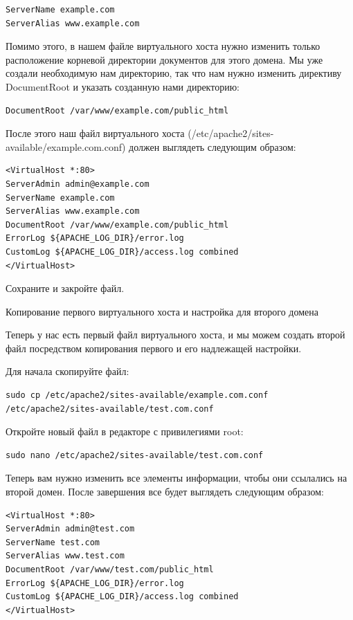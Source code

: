 \documentclass[14pt, a4paper]{article}
\begin{document}
\begin{lstlisting}
ServerName example.com
ServerAlias www.example.com
\end{lstlisting}

Помимо этого, в нашем файле виртуального хоста нужно изменить только расположение корневой 
директории документов для этого домена. Мы уже создали необходимую нам директорию, так что 
нам нужно изменить директиву DocumentRoot и указать созданную нами директорию:

\begin{lstlisting}
DocumentRoot /var/www/example.com/public_html
\end{lstlisting}

После этого наш файл виртуального хоста \linebreak (/etc/apache2/sites-available/example.com.conf) должен выглядеть следующим образом:

\begin{lstlisting}
<VirtualHost *:80>
ServerAdmin admin@example.com
ServerName example.com
ServerAlias www.example.com
DocumentRoot /var/www/example.com/public_html
ErrorLog ${APACHE_LOG_DIR}/error.log
CustomLog ${APACHE_LOG_DIR}/access.log combined
</VirtualHost>
\end{lstlisting}
Сохраните и закройте файл.

Копирование первого виртуального хоста и настройка для второго домена

Теперь у нас есть первый файл виртуального хоста, и мы можем создать второй файл посредством 
копирования первого и его надлежащей настройки.

Для начала скопируйте файл:
\begin{lstlisting}
sudo cp /etc/apache2/sites-available/example.com.conf /etc/apache2/sites-available/test.com.conf
\end{lstlisting}

Откройте новый файл в редакторе с привилегиями root:
\begin{lstlisting}
sudo nano /etc/apache2/sites-available/test.com.conf 
\end{lstlisting}

Теперь вам нужно изменить все элементы информации, чтобы они ссылались на второй домен. 
После завершения все будет выглядеть следующим образом:

\begin{lstlisting}
<VirtualHost *:80>
ServerAdmin admin@test.com
ServerName test.com
ServerAlias www.test.com
DocumentRoot /var/www/test.com/public_html
ErrorLog ${APACHE_LOG_DIR}/error.log
CustomLog ${APACHE_LOG_DIR}/access.log combined
</VirtualHost>
\end{lstlisting}
\end{document}
